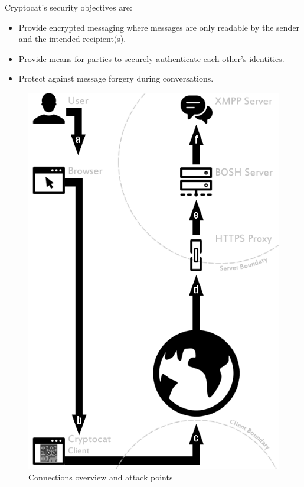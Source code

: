 \documentclass[letterpaper,twocolumn,10pt]{article}
\begin{document}
Cryptocat's security objectives are:
\vspace{0mm}
\begin{itemize}
\setlength{\itemsep}{1pt}
\setlength{\parskip}{1pt}
\item Provide encrypted messaging where messages are only readable by the sender and the intended recipient(s).
\item Provide means for parties to securely authenticate each other's identities.
\item Protect against message forgery during conversations.
\end{itemize}
\begin{figure}[t]
\centering
\includegraphics[scale=0.40]{connections-overview}
\caption{Connections overview and attack points}
\end{figure}
\end{document}
